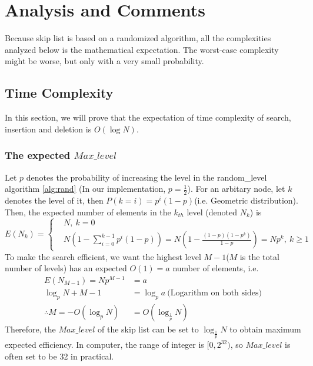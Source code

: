 \section{Analysis and Comments}
Because skip list is based on a randomized algorithm, all the complexities analyzed below is the mathematical expectation. The worst-case complexity might be worse, but only with a very small probability.
\subsection{Time Complexity}
In this section, we will prove that the expectation of time complexity of search, insertion and deletion is $O(\log{N})$.
\subsubsection{The expected $Max\_level$}
Let $p$ denotes the probability of increasing the level in the random\_level algorithm \ref{alg:rand} (In our implementation, $p=\frac 1 2$). For an arbitary node, let $k$ denotes the level of it, then $P(k=i)=p^i(1-p)$(i.e. Geometric distribution). Then, the expected number of elements in the $k_{th}$ level (denoted $N_k$) is 
\[
    E(N_k) = \left\{
        \begin{aligned}
            &N,\ k=0\\
            &N(1-\sum_{i=0}^{k-1}p^i(1-p))=N(1-\frac{(1-p)(1-p^k)}{1-p})=Np^k,\ k\geq 1
        \end{aligned}
    \right.
\]
To make the search efficient, we want the highest level $M-1$($M$ is the total number of levels) has an expected $O(1)=a$ number of elements, i.e.
\begin{align*}
    E(N_{M-1})=Np^{M-1}&=a\\
    \log_p{N}+M-1&=\log_p{a}\ \text{(Logarithm on both sides)}\\
    \therefore M=-O(\log_p{N})&=O(\log_\frac{1}{p}N)
\end{align*}
Therefore, the $Max\_level$ of the skip list can be set to $\log_\frac{1}{p}N$ to obtain maximum expected efficiency. In computer, the range of integer is $[0,2^{32})$, so $Max\_level$ is often set to be 32 in practical.
